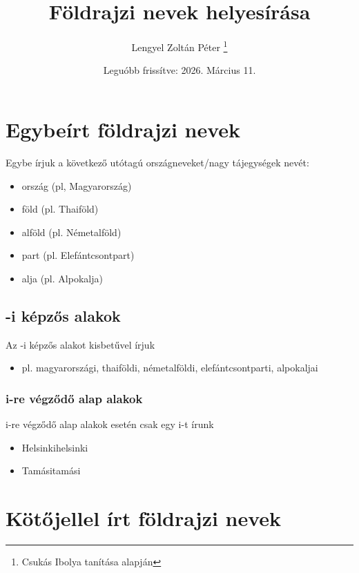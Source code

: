 \documentclass{article}
\title{Földrajzi nevek helyesírása}
\author{Lengyel Zoltán Péter \thanks{Csukás Ibolya tanítása alapján}}
\date{Leguóbb frissítve: 2026. Március 11.}
\begin{document}
\maketitle

\tableofcontents
\newpage

\section{Egybeírt földrajzi nevek}
Egybe írjuk a következő utótagú országneveket/nagy tájegységek nevét:
\begin{itemize}
    \item ország (pl, Magyarország)
    \item föld (pl. Thaiföld)
    \item alföld (pl. Németalföld)
    \item part (pl. Elefántcsontpart)
    \item alja (pl. Alpokalja)
\end{itemize} 

\subsection{-i képzős alakok}
Az -i képzős alakot kisbetűvel írjuk
\begin{itemize}
    \item pl. magyarországi, thaiföldi, németalföldi, elefántcsontparti, alpokaljai
\end{itemize}

\subsubsection{i-re végződő alap alakok}
i-re végződő alap alakok esetén csak egy i-t írunk
\begin{itemize}
    \item Helsinki\textrightarrow helsinki
    \item Tamási\textrightarrow tamási
\end{itemize}

\section{Kötőjellel írt földrajzi nevek}
\end{document}
